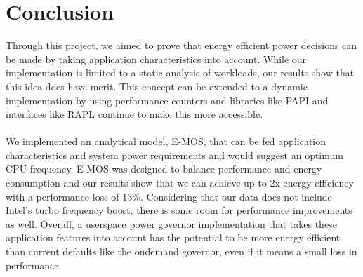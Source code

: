 \section{Conclusion}\label{sec:conc}
Through this project, we aimed to prove that energy efficient power decisions can be made by taking application 
characteristics into account. While our implementation is limited to a static analysis of workloads, our results show that 
this idea does have merit. This concept can be extended to a dynamic implementation by using performance counters and 
libraries like PAPI and interfaces like RAPL continue to make this more accessible. 
\paragraph{}We implemented an analytical model, E-MOS, that can be fed application characteristics and system power requirements 
and would suggest an optimum CPU frequency. E-MOS was designed to balance performance and energy consumption and our 
results show that we can achieve up to 2x energy efficiency with a performance loss of 13\%. Considering that our data 
does not include Intel's turbo frequency boost, there is some room for performance improvements as well.
Overall, a userspace power governor implementation that takes these application features into account has the potential to 
be more energy efficient than current defaults like the ondemand governor, even if it means a small loss in performance.
